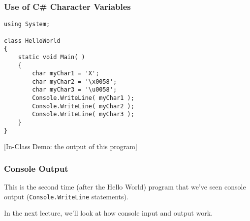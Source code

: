 \begin{frame}[fragile]
\frametitle{Use of C\# Character Variables}

\begin{verbatim}
using System;

class HelloWorld
{
    static void Main( )
    {
        char myChar1 = 'X';
        char myChar2 = '\x0058';
        char myChar3 = '\u0058';
        Console.WriteLine( myChar1 );
        Console.WriteLine( myChar2 );
        Console.WriteLine( myChar3 );
    }
}
\end{verbatim}

[In-Class Demo: the output of this program]

\end{frame}

\begin{frame}
\frametitle{Console Output}

This is the second time (after the Hello World) program that we've seen console output (\texttt{Console.WriteLine} statements).

In the next lecture, we'll look at how console input and output work.

\end{frame}



